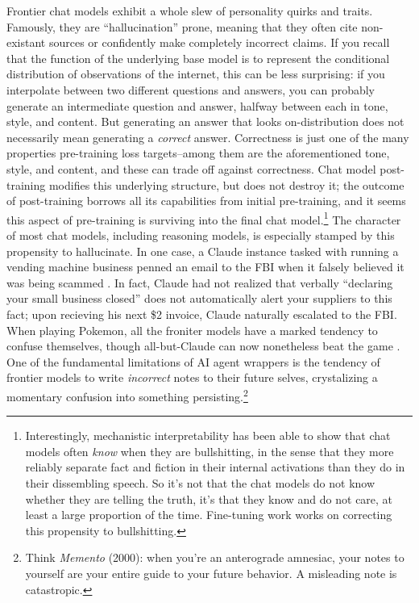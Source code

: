 Frontier chat models exhibit a whole slew of personality quirks and traits.
Famously, they are ``hallucination'' prone, meaning that they often cite
non-existant sources or confidently make completely incorrect claims. If you
recall that the function of the underlying base model is to represent the
conditional distribution of observations of the internet, this can be less
surprising: if you interpolate between two different questions and answers, you
can probably generate an intermediate question and answer, halfway between each
in tone, style, and content. But generating an answer that looks
on-distribution does not necessarily mean generating a \emph{correct} answer.
Correctness is just one of the many properties pre-training loss targets--among
them are the aforementioned tone, style, and content, and these can trade off
against correctness. Chat model post-training modifies this underlying
structure, but does not destroy it; the outcome of post-training borrows all
its capabilities from initial pre-training, and it seems this aspect of
pre-training is surviving into the final chat model.\footnote{Interestingly,
mechanistic interpretability has been able to show that chat models often
\emph{know} when they are bullshitting, in the sense that they more reliably
separate fact and fiction in their internal activations than they do in their
dissembling speech. So it's not that the chat models do not know whether they
are telling the truth, it's that they know and do not care, at least a large
proportion of the time. Fine-tuning work works on correcting this propensity to
bullshitting.} The character of most chat models, including reasoning models,
is especially stamped by this propensity to hallucinate. In one case, a Claude
instance tasked with running a vending machine business penned an email to the
FBI when it falsely believed it was being scammed \cite{backlund2025vending}.
In fact, Claude had not realized that verbally ``declaring your small business
closed'' does not automatically alert your suppliers to this fact; upon
recieving his next \$2 invoice, Claude naturally escalated to the FBI. When
playing Pokemon, all the froniter models have a marked tendency to confuse
themselves, though all-but-Claude can now nonetheless beat the game \cite{}.
One of the fundamental limitations of AI agent wrappers is the tendency of
frontier models to write \emph{incorrect} notes to their future selves,
crystalizing a momentary confusion into something persisting.\footnote{Think
\emph{Memento} (2000): when you're an anterograde amnesiac, your notes to
yourself are your entire guide to your future behavior. A misleading note is
catastropic.}

